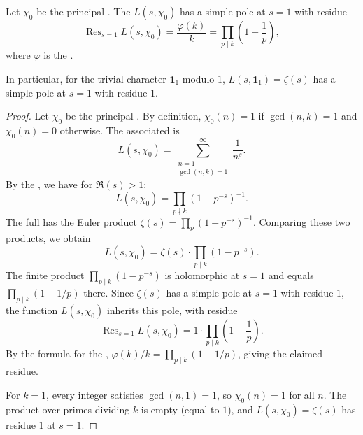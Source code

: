 \begin{corollary}[Pole of Dirichlet L-function at s = 1 for principal characters] \label{corollary:pole_of_dirichlet_L_function_at_s_equals_1_for_principal_characters}
Let $\chi_0$ be the principal . The  $L(s, \chi_0)$ has a simple pole at $s = 1$ with residue
$$
\operatorname{Res}_{s=1} L(s, \chi_0) = \frac{\varphi(k)}{k} = \prod_{p \mid k} \left( 1 - \frac{1}{p} \right),
$$
where $\varphi$ is the .

In particular, for the trivial character $\mathbf{1}_1$ modulo $1$, $L(s, \mathbf{1}_1) = \zeta(s)$ has a simple pole at $s=1$ with residue $1$.
\end{corollary}

\begin{proof}
    Let $\chi_0$ be the principal . By definition, $\chi_0(n) = 1$ if $\gcd(n,k) = 1$ and $\chi_0(n) = 0$ otherwise. The associated  is
    $$L(s, \chi_0) = \sum_{\substack{n=1 \\ \gcd(n,k)=1}}^\infty \frac{1}{n^s}.$$
    By the , we have for $\Re(s) > 1$:
    $$L(s, \chi_0) = \prod_{p \nmid k} \left(1 - p^{-s}\right)^{-1}.$$
    The full  has the Euler product $\zeta(s) = \prod_p (1 - p^{-s})^{-1}$. Comparing these two products, we obtain
    $$L(s, \chi_0) = \zeta(s) \cdot \prod_{p \mid k} \left(1 - p^{-s}\right).$$
    The finite product $\prod_{p \mid k} (1 - p^{-s})$ is holomorphic at $s = 1$ and equals $\prod_{p \mid k} (1 - 1/p)$ there. Since $\zeta(s)$ has a simple pole at $s = 1$ with residue $1$, the function $L(s, \chi_0)$ inherits this pole, with residue
    $$\operatorname{Res}_{s=1} L(s, \chi_0) = 1 \cdot \prod_{p \mid k} \left(1 - \frac{1}{p}\right).$$
    By the formula for the , $\varphi(k)/k = \prod_{p \mid k} (1 - 1/p)$, giving the claimed residue.

    For $k = 1$, every integer satisfies $\gcd(n,1) = 1$, so $\chi_0(n) = 1$ for all $n$. The product over primes dividing $k$ is empty (equal to $1$), and $L(s, \chi_0) = \zeta(s)$ has residue $1$ at $s = 1$.
\end{proof}